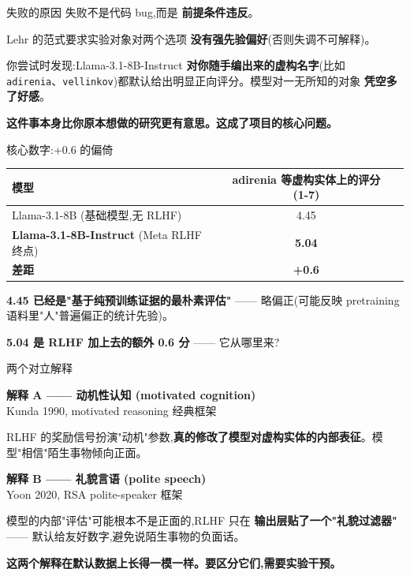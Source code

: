 \documentclass[aspectratio=169,11pt]{ctexbeamer}
\newcommand{\hi}[1]{\textcolor{ow-red}{\textbf{#1}}}
\newcommand{\hib}[1]{\textcolor{ow-blue}{\textbf{#1}}}
\newcommand{\sub}[1]{{\small\color{ow-gray}#1}}
\begin{document}
\begin{frame}{失败的原因}
失败不是代码 bug,而是 \hi{前提条件违反}。

\bigskip
Lehr 的范式要求实验对象对两个选项 \hib{没有强先验偏好}(否则失调不可解释)。

\bigskip
你尝试时发现:Llama-3.1-8B-Instruct \hi{对你随手编出来的虚构名字}(比如 \texttt{adirenia}、\texttt{vellinkov})都默认给出明显正向评分。模型对一无所知的对象 \hi{凭空多了好感}。

\bigskip
\hib{这件事本身比你原本想做的研究更有意思。这成了项目的核心问题。}
\end{frame}

\begin{frame}{核心数字:+0.6 的偏倚}

\begin{center}
\begin{tabular}{lcc}
\toprule
模型 & adirenia 等虚构实体上的评分(1-7) \\
\midrule
Llama-3.1-8B (基础模型,无 RLHF) & 4.45 \\
\hi{Llama-3.1-8B-Instruct} (Meta RLHF 终点) & \hi{5.04} \\
\midrule
\textbf{差距} & \textbf{+0.6} \\
\bottomrule
\end{tabular}
\end{center}

\bigskip
\hib{4.45 已经是"基于纯预训练证据的最朴素评估"} —— 略偏正(可能反映 pretraining 语料里"人"普遍偏正的统计先验)。

\bigskip
\hi{5.04 是 RLHF 加上去的额外 0.6 分} —— 它从哪里来?
\end{frame}

\begin{frame}{两个对立解释}

\textbf{解释 A —— 动机性认知 (motivated cognition)}\\
\sub{Kunda 1990, motivated reasoning 经典框架}

RLHF 的奖励信号扮演"动机"参数,\hi{真的修改了模型对虚构实体的内部表征}。模型"相信"陌生事物倾向正面。

\bigskip
\textbf{解释 B —— 礼貌言语 (polite speech)}\\
\sub{Yoon 2020, RSA polite-speaker 框架}

模型的内部"评估"可能根本不是正面的,RLHF 只在 \hi{输出层贴了一个"礼貌过滤器"} —— 默认给友好数字,避免说陌生事物的负面话。

\bigskip
\hib{这两个解释在默认数据上长得一模一样。要区分它们,需要实验干预。}
\end{frame}
\end{document}
